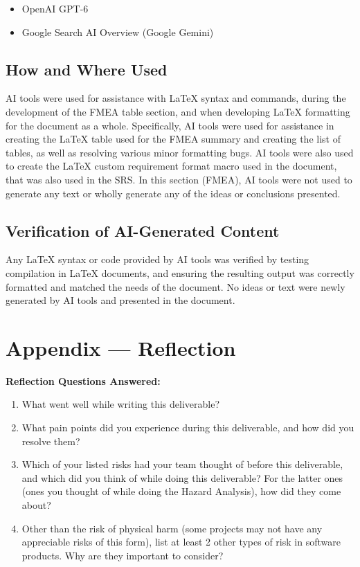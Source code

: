 \documentclass{article}
\begin{document}
\begin{itemize}
	\item OpenAI GPT-6
	\item Google Search AI Overview (Google Gemini)
\end{itemize}

\subsection*{How and Where Used}

AI tools were used for assistance with LaTeX syntax and commands, during 
the development of the FMEA table section, and when developing 
LaTeX formatting for the document as a whole. Specifically, AI tools were 
used for assistance in creating the LaTeX table used for the FMEA summary and 
creating the list of tables, as well as resolving various minor formatting 
bugs. AI tools were also used to create the LaTeX custom requirement format 
macro used in the document, that was also used in the SRS. In this section 
(FMEA), 
AI tools were not used to generate any text or wholly generate any of the 
ideas or conclusions presented.

\subsection*{Verification of AI-Generated Content}

Any LaTeX syntax or code provided by AI tools was verified by testing 
compilation in LaTeX documents, and ensuring the resulting output was 
correctly formatted and matched the needs of the document. No ideas or text 
were newly generated by AI tools and presented in the document.



\newpage{}

\section{Appendix --- Reflection}

\textbf{Reflection Questions Answered:}

\begin{enumerate}
    \item What went well while writing this deliverable? 
    \item What pain points did you experience during this deliverable, and how
    did you resolve them?
    \item Which of your listed risks had your team thought of before this
    deliverable, and which did you think of while doing this deliverable? For
    the latter ones (ones you thought of while doing the Hazard Analysis), how
    did they come about?
    \item Other than the risk of physical harm (some projects may not have any
    appreciable risks of this form), list at least 2 other types of risk in
    software products. Why are they important to consider?
\end{enumerate}
\end{document}
